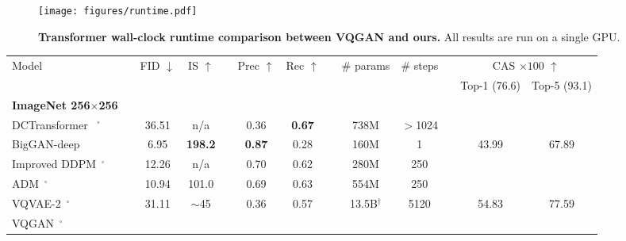 \begin{figure}[!t]
	\centering
	\texttt{[image: figures/runtime.pdf]}
	\vspace{-5mm}
	\caption{\textbf{Transformer wall-clock runtime comparison between VQGAN\cite{Esser21vqgan} and ours.} All results are run on a single GPU. }
	\label{fig:speed}
 	\vspace{-4mm}
\end{figure}{

\begin{table*}[h]
\small
    \centering
    {\small
    \begin{tabular}{lc ccc ccc ccc cc}
    \toprule
     {Model} & 
    
     & {FID}  $\downarrow$ & {IS}  $\uparrow$ & 
     &  {Prec}  $\uparrow$ & {Rec}   $\uparrow$ &
     
     &{\# params} & {\# steps} &
     
     & \multicolumn{2}{c}{{CAS $\times 100$} $\uparrow$}  
     \\
     \cline{12-13}
    &&  && & &&& & && {Top-1 (76.6)} & {Top-5 (93.1)} \\[-7pt]
    \textbf{ImageNet 256$\times$256} && &&& &&& &&& &
    \\[-2pt]
    \midrule
    
    DCTransformer~\cite{nash2021generating} $^\square$ &
    & 36.51 & n/a &
    & 0.36 & \textbf{0.67} &
    & 738M & $>$1024 &   & &
     \\ 
    
    BigGAN-deep~\cite{biggan}  & %
    & 6.95 & \bfseries{198.2} &
    & \textbf{0.87} & 0.28 &
    & 160M & 1 & & 43.99 &67.89
    \\
    
    Improved DDPM~\cite{nichol2021improved}$^\square$  &
    & 12.26 & n/a  &
    & 0.70 & 0.62 &
     & 280M & 250  &  &  & \\
    
    ADM~\cite{dhariwal2021diffusion}$^\square$   & 
    & 10.94 & 101.0  &
    & 0.69 & 0.63 &
    & 554M & 250 &  &  & \\
    

    
    VQVAE-2~\cite{Razavi19vqvae2}$^\square$ &
    & 31.11 & $\sim$45 &
    & 0.36 & 0.57 &
    & 13.5B$^\dagger$ & 5120 & & 54.83 & 77.59 \\
    \midrule
    VQGAN~\cite{Esser21vqgan}$^\square$ &
    

\end{tabular}}
\end{table*}}
